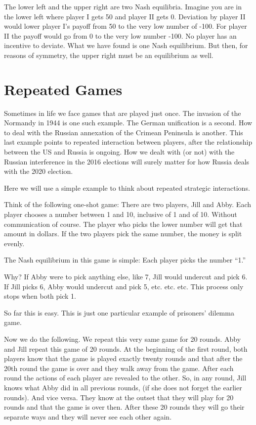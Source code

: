 \documentclass[
]{book}
\begin{document}
The lower left and the upper right are two Nash equilibria. Imagine you are in the lower left where player I gets 50 and player II gets 0. Deviation by player II would lower player I's payoff from 50 to the very low number of -100. For player II the payoff would go from 0 to the very low number -100. No player has an incentive to deviate. What we have found is one Nash equilibrium. But then, for reasons of symmetry, the upper right must be an equilibrium as well.

\hypertarget{repeated-games}{%
\section{Repeated Games}\label{repeated-games}}

Sometimes in life we face games that are played just once. The invasion of the Normandy in 1944 is one such example. The German unification is a second. How to deal with the Russian annexation of the Crimean Peninsula is another. This last example points to repeated interaction between players, after the relationship between the US and Russia is ongoing. How we dealt with (or not) with the Russian interference in the 2016 elections will surely matter for how Russia deals with the 2020 election.

Here we will use a simple example to think about repeated strategic interactions.

Think of the following one-shot game: There are two players, Jill and Abby. Each player chooses a number between 1 and 10, inclusive of 1 and of 10. Without communication of course. The player who picks the lower number will get that amount in dollars. If the two players pick the same number, the money is split evenly.

The Nash equilibrium in this game is simple: Each player picks the number ``1.''

Why? If Abby were to pick anything else, like 7, Jill would undercut and pick 6. If Jill picks 6, Abby would undercut and pick 5, etc. etc. etc. This process only stops when both pick 1.

So far this is easy. This is just one particular example of prisoners' dilemma game.

Now we do the following. We repeat this very same game for 20 rounds. Abby and Jill repeat this game of 20 rounds. At the beginning of the first round, both players know that the game is played exactly twenty rounds and that after the 20th round the game is over and they walk away from the game. After each round the actions of each player are revealed to the other. So, in any round, Jill knows what Abby did in all previous rounds, (if she does not forget the earlier rounds). And vice versa. They know at the outset that they will play for 20 rounds and that the game is over then. After these 20 rounds they will go their separate ways and they will never see each other again.
\end{document}
